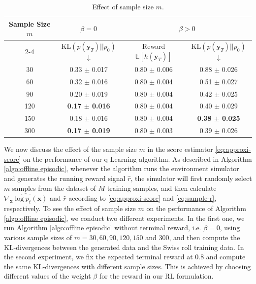 \documentclass[11pt]{article}
\begin{document}
\begin{table}[h]
	\centering
	\begin{tabular}{c || c | c c}
        \hline \multirow{2}{*}{Sample Size $m$} & $\beta = 0$ &  \multicolumn{2}{c}{$\beta > 0$} \\\cline{2-4}
        & KL$(p(\mathbf{y}_T) || p_0)$ $\downarrow$ & Reward $\mathbb{E}[h(\mathbf{y}_T)]$ & KL$(p(\mathbf{y}_T) || p_0)$ $\downarrow$\\\hline
		30 &  0.33 $\pm$ 0.017 & 0.80 $\pm$ 0.006 & 0.88 $\pm$ 0.026 \\	

		60 & 0.32 $\pm$ 0.016 & 0.80 $\pm$ 0.004 & 0.51 $\pm$ 0.027 \\

		90 & 0.20 $\pm$ 0.019 & 0.80 $\pm$ 0.004 & 0.42 $\pm$ 0.025\\				
        120 & \textbf{0.17 $\pm$ 0.016} & 0.80 $\pm$ 0.004 & 0.40 $\pm$ 0.029 \\
	
		150 &  0.18 $\pm$ 0.016 & 0.80 $\pm$ 0.004 & \textbf{0.38 $\pm$ 0.025} \\

        300 & \textbf{0.17 $\pm$ 0.019} & 0.80 $\pm$ 0.003 & 0.39 $\pm$ 0.026
		\\ \hline
		
	\end{tabular}
	\captionsetup{justification=centering}
	\caption{Effect of sample size $m$. }
	\label{table: 2D_target_size_cmp}
\end{table}

 We now discuss the effect of the sample size $m$ in the score estimator \eqref{eq:approxi-score} on the performance of our q-Learning algorithm.
 As described in Algorithm \ref{algo:offline episodic}, whenever the algorithm runs the environment simulator and generates the running reward signal $\hat r$, the simulator will first randomly select $m$ samples from the dataset of $M$ training samples, and then calculate $\widehat{ \nabla_{\mathbf{x}}\log p_{t}(\mathbf{x}) } $ and $\hat r$ according to \eqref{eq:approxi-score} and \eqref{eq:sample-r}, respectively. To see the effect of sample size $m$ on the performance of Algorithm \ref{algo:offline episodic}, we conduct two different experiments. In the first one, we run Algorithm \ref{algo:offline episodic} without terminal reward, i.e. $\beta = 0$, using various sample sizes of $m=30,60, 90, 120, 150$ and $300$, and then compute the KL-divergences between the generated data and the Swiss roll training data. In the second experiment, we fix the expected terminal reward at 0.8 and compute the same KL-divergences with different sample sizes. This is achieved by choosing different values of the weight $\beta$ for the reward in our RL formulation.
\end{document}
